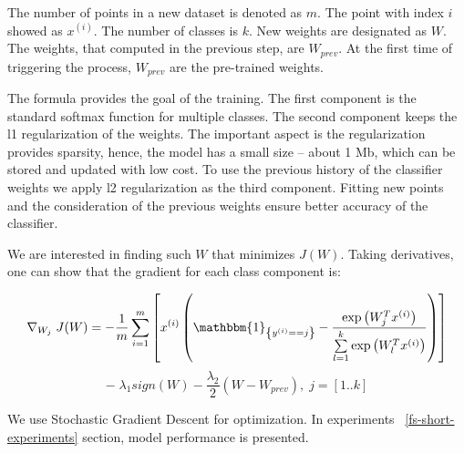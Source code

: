 The number of points in a new dataset is denoted as $m$. The point with index $i$ showed as $x^{(i)}$. The number of classes is $k$. New weights are designated as $W$. The weights, that computed in the previous step, are $W_{prev}$. At the first time of triggering the process, $W_{prev}$ are the pre-trained weights. 

The formula provides the goal of the training. The first component is the standard softmax function for multiple classes. The second component keeps the l1 regularization of the weights. The important aspect is the regularization provides sparsity, hence, the model has a small size -- about 1 Mb, which can be stored and updated with low cost. To use the previous history of the classifier weights we apply l2 regularization as the third component. Fitting new points and the consideration of the previous weights ensure better accuracy of the classifier.

We are interested in finding such $W$ that minimizes $J(W)$. Taking derivatives, one can show that the gradient for each class component is:

\begin{center}

$$ \nabla_{W_j} \; J(W) = -\frac{1}{m} \sum \limits_{i = 1}^{m} \left[ x^{(i)} \left( \mathbbm{1}_{\left\{y^{(i)} == j\right\} } - \frac{\exp\left({W_{j}^Tx^{(i)}}\right)}{\sum \limits_{l = 1}^{k}  \exp\left({W_{l}^Tx^{(i)}}\right)} \right) \right] $$
$$ - \; \lambda_1 sign\left(W\right) - \frac{\lambda_2}{2} \left(W - W_{prev} \right), \; j = [1..k] $$

\end{center} 

We use Stochastic Gradient Descent for optimization. In experiments ~\ref{fs-short-experiments} section, model performance is presented.
